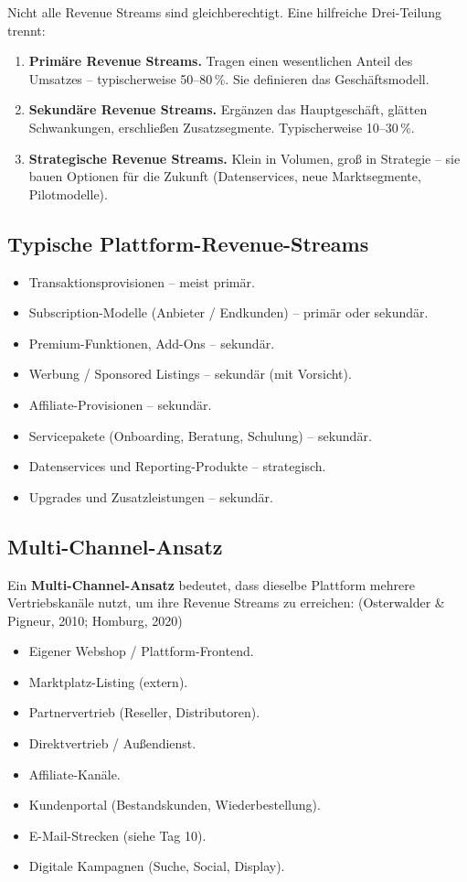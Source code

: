 \documentclass[11pt,a4paper,oneside]{article}
\newcommand{\fachbegriff}[1]{\textbf{#1}}
\newcommand{\quelle}[1]{{\footnotesize\color{lpGray}(#1)}}
\begin{document}
Nicht alle Revenue Streams sind gleichberechtigt. Eine hilfreiche Drei-Teilung trennt:

\begin{enumerate}
  \item \fachbegriff{Primäre Revenue Streams.} Tragen einen wesentlichen Anteil des Umsatzes -- typischerweise 50--80\,\%. Sie definieren das Geschäftsmodell.
  \item \fachbegriff{Sekundäre Revenue Streams.} Ergänzen das Hauptgeschäft, glätten Schwankungen, erschließen Zusatzsegmente. Typischerweise 10--30\,\%.
  \item \fachbegriff{Strategische Revenue Streams.} Klein in Volumen, groß in Strategie -- sie bauen Optionen für die Zukunft (Datenservices, neue Marktsegmente, Pilotmodelle).
\end{enumerate}

\subsection{Typische Plattform-Revenue-Streams}

\begin{itemize}
  \item Transaktionsprovisionen -- meist primär.
  \item Subscription-Modelle (Anbieter / Endkunden) -- primär oder sekundär.
  \item Premium-Funktionen, Add-Ons -- sekundär.
  \item Werbung / Sponsored Listings -- sekundär (mit Vorsicht).
  \item Affiliate-Provisionen -- sekundär.
  \item Servicepakete (Onboarding, Beratung, Schulung) -- sekundär.
  \item Datenservices und Reporting-Produkte -- strategisch.
  \item Upgrades und Zusatzleistungen -- sekundär.
\end{itemize}

\subsection{Multi-Channel-Ansatz}

Ein \fachbegriff{Multi-Channel-Ansatz} bedeutet, dass dieselbe Plattform mehrere Vertriebskanäle nutzt, um ihre Revenue Streams zu erreichen: \quelle{Osterwalder \& Pigneur, 2010; Homburg, 2020}

\begin{itemize}
  \item Eigener Webshop / Plattform-Frontend.
  \item Marktplatz-Listing (extern).
  \item Partnervertrieb (Reseller, Distributoren).
  \item Direktvertrieb / Außendienst.
  \item Affiliate-Kanäle.
  \item Kundenportal (Bestandskunden, Wiederbestellung).
  \item E-Mail-Strecken (siehe Tag 10).
  \item Digitale Kampagnen (Suche, Social, Display).
\end{itemize}
\end{document}

